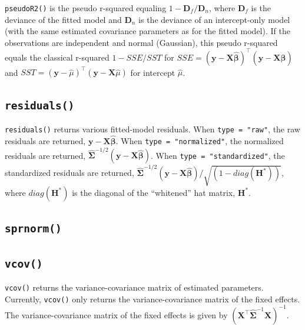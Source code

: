 \documentclass{article}
\begin{document}
\texttt{pseudoR2()} is the pseudo r-squared equaling
\(1 - \mathbf{D}_f / \mathbf{D}_n\), where \(\mathbf{D}_f\) is the
deviance of the fitted model and \(\mathbf{D}_n\) is the deviance of an
intercept-only model (with the same estimated covariance parameters as
for the fitted model). If the observations are independent and normal
(Gaussian), this pseudo r-squared equals the classical r-squared
\(1 - SSE / SST\) for
\(SSE = (\mathbf{y} - \mathbf{X} \hat{\boldsymbol{\beta}})^\intercal (\mathbf{y} - \mathbf{X} \hat{\boldsymbol{\beta}})\)
and
\(SST = (\mathbf{y} - \hat{\mu})^\intercal (\mathbf{y} - \mathbf{X} \hat{\mu})\)
for intercept \(\hat{\mu}\).

\hypertarget{residuals}{%
\subsection{\texorpdfstring{\texttt{residuals()}}{residuals()}}\label{residuals}}

\texttt{residuals()} returns various fitted-model residuals. When
\texttt{type\ =\ "raw"}, the raw residuals are returned,
\(\mathbf{y} - \mathbf{X} \hat{\boldsymbol{\beta}}\). When
\texttt{type\ =\ "normalized"}, the normalized residuals are returned,
\(\hat{\boldsymbol{\Sigma}}^{-1/2}(\mathbf{y} - \mathbf{X} \hat{\boldsymbol{\beta}})\).
When \texttt{type\ =\ "standardized"}, the standardized residuals are
returned,
\(\hat{\boldsymbol{\Sigma}}^{-1/2}(\mathbf{y} - \mathbf{X} \hat{\boldsymbol{\beta}})/ \sqrt{(1 - diag(\mathbf{H}^*))}\),
where \(diag(\mathbf{H}^*)\) is the diagonal of the ``whitened'' hat
matrix, \(\mathbf{H}^*\).

\hypertarget{sprnorm}{%
\subsection{\texorpdfstring{\texttt{sprnorm()}}{sprnorm()}}\label{sprnorm}}

\hypertarget{vcov}{%
\subsection{\texorpdfstring{\texttt{vcov()}}{vcov()}}\label{vcov}}

\texttt{vcov()} returns the variance-covariance matrix of estimated
parameters. Currently, \texttt{vcov()} only returns the
variance-covariance matrix of the fixed effects. The variance-covariance
matrix of the fixed effects is given by
\((\mathbf{X}^\intercal \hat{\boldsymbol{\Sigma}}^{-1} \mathbf{X})^{-1}\).
\end{document}
